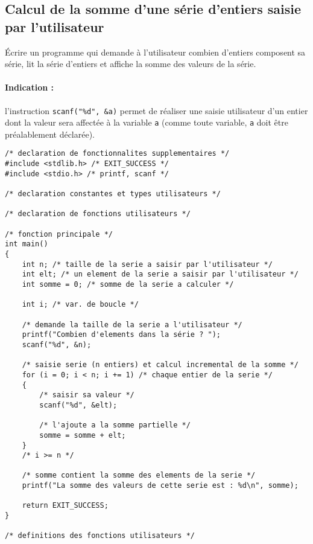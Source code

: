 \subsection{Calcul de la somme d'une série d'entiers saisie par l'utilisateur}

Écrire un programme  qui demande à l'utilisateur combien d'entiers
composent sa série, lit la série d'entiers et affiche la somme des
valeurs de la série.

\paragraph{Indication :} l'instruction
\verb+scanf("%d", &a)+
permet de réaliser une saisie utilisateur d'un entier dont la valeur
sera affectée à la variable \texttt{a} (comme toute variable, \texttt{a} doit
être préalablement déclarée).

\begin{correction}
\begin{verbatim}
/* declaration de fonctionnalites supplementaires */
#include <stdlib.h> /* EXIT_SUCCESS */
#include <stdio.h> /* printf, scanf */

/* declaration constantes et types utilisateurs */

/* declaration de fonctions utilisateurs */

/* fonction principale */
int main()
{
    int n; /* taille de la serie a saisir par l'utilisateur */
    int elt; /* un element de la serie a saisir par l'utilisateur */
    int somme = 0; /* somme de la serie a calculer */

    int i; /* var. de boucle */

    /* demande la taille de la serie a l'utilisateur */
    printf("Combien d'elements dans la série ? ");
    scanf("%d", &n);

    /* saisie serie (n entiers) et calcul incremental de la somme */
    for (i = 0; i < n; i += 1) /* chaque entier de la serie */
    {
        /* saisir sa valeur */
        scanf("%d", &elt);

        /* l'ajoute a la somme partielle */
        somme = somme + elt;
    }
    /* i >= n */

    /* somme contient la somme des elements de la serie */
    printf("La somme des valeurs de cette serie est : %d\n", somme);

    return EXIT_SUCCESS;
}

/* definitions des fonctions utilisateurs */
\end{verbatim}
\end{correction}


